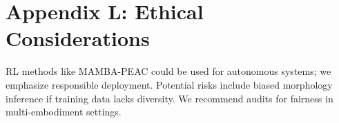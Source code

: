 \documentclass{article}
\begin{document}
\section{Appendix L: Ethical Considerations}
RL methods like MAMBA-PEAC could be used for autonomous systems; we emphasize responsible deployment. Potential risks include biased morphology inference if training data lacks diversity. We recommend audits for fairness in multi-embodiment settings.



\end{document}
